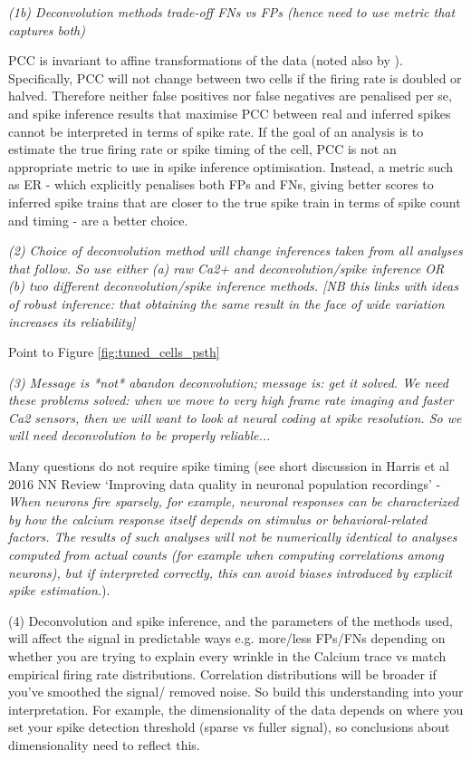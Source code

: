\documentclass[a4paper,10pt,twocolumn]{article}
\begin{document}
\emph{(1b) Deconvolution methods trade-off FNs vs FPs (hence need to use metric that captures both)}

PCC is invariant to affine transformations of the data (noted also by \citep{Theis2016-ee}). Specifically, PCC will not change between two cells if the firing rate is doubled or halved. Therefore neither false positives nor false negatives are penalised per se, and spike inference results that maximise PCC between real and inferred spikes cannot be interpreted in terms of spike rate. If the goal of an analysis is to estimate the true firing rate or spike timing of the cell, PCC is not an appropriate metric to use in spike inference optimisation. Instead, a metric such as ER - which explicitly penalises both FPs and FNs, giving better scores to inferred spike trains that are closer to the true spike train in terms of spike count and timing - are a better choice.


\emph{(2) Choice of deconvolution method will change inferences taken from all analyses that follow. So use either (a) raw Ca2+ and deconvolution/spike inference OR (b) two different deconvolution/spike inference methods. [NB this links with ideas of robust inference: that obtaining the same result in the face of wide variation increases its reliability]}

Point to Figure \ref{fig:tuned_cells_psth}

\emph{(3) Message is *not* abandon deconvolution; message is: get it solved. We need these problems solved: when we move to very high frame rate imaging and faster Ca2 sensors, then we will want to look at neural coding at spike resolution. So we will need deconvolution to be properly reliable...}

Many questions do not require spike timing (see short discussion in Harris et al 2016 NN Review `Improving data quality in neuronal population recordings' - \emph{When neurons fire sparsely, for example, neuronal responses can be characterized by how the calcium response itself depends on stimulus or behavioral-related factors. The results of such analyses will not be numerically identical to analyses computed from actual counts (for example when computing correlations among neurons), but if interpreted correctly, this can avoid biases introduced by explicit spike estimation.}). 

(4) Deconvolution and spike inference, and the parameters of the methods used, will affect the signal in predictable ways e.g. more/less FPs/FNs depending on whether you are trying to explain every wrinkle in the Calcium trace vs match empirical firing rate distributions. Correlation distributions will be broader if you've smoothed the signal/ removed noise. So build this understanding into your interpretation.
For example, the dimensionality of the data depends on where you set your spike detection threshold (sparse vs fuller signal), so conclusions about dimensionality need to reflect this.
\end{document}
